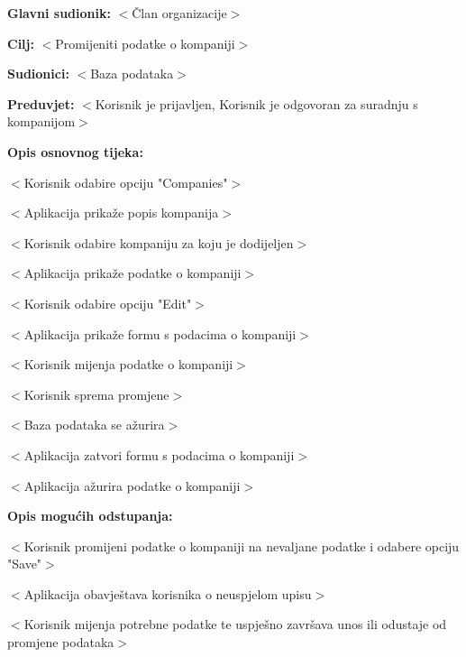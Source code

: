 					\noindent {}
					\begin{packed_item}

						\item \textbf{Glavni sudionik:} $<$Član organizacije$>$
						\item \textbf{Cilj:} $<$Promijeniti podatke o kompaniji$>$
						\item \textbf{Sudionici:} $<$Baza podataka$>$
						\item \textbf{Preduvjet:} $<$Korisnik je prijavljen, Korisnik je odgovoran za suradnju s kompanijom$>$
						\item \textbf{Opis osnovnog tijeka:}

						\item[] \begin{packed_enum}

							\item $<$Korisnik odabire opciju "Companies"$>$
							\item $<$Aplikacija prikaže popis kompanija$>$
							\item $<$Korisnik odabire kompaniju za koju je dodijeljen$>$
							\item $<$Aplikacija prikaže podatke o kompaniji$>$
							\item $<$Korisnik odabire opciju "Edit"$>$
							\item $<$Aplikacija prikaže formu s podacima o kompaniji$>$
							\item $<$Korisnik mijenja podatke o kompaniji$>$
							\item $<$Korisnik sprema promjene$>$
							\item $<$Baza podataka se ažurira$>$
							\item $<$Aplikacija zatvori formu s podacima o kompaniji$>$
							\item $<$Aplikacija ažurira podatke o kompaniji$>$
						\end{packed_enum}

						\item \textbf{Opis mogućih odstupanja:}

						\item[] \begin{packed_item}

							\item[5.b] $<$Korisnik promijeni podatke o kompaniji na nevaljane podatke i odabere opciju "Save"$>$
							\item[] \begin{packed_enum}

								\item $<$Aplikacija obavještava korisnika o neuspjelom upisu$>$
								\item $<$Korisnik mijenja potrebne podatke te uspješno završava unos ili
								odustaje od promjene podataka$>$

							\end{packed_enum}

						\end{packed_item}
					\end{packed_item}

